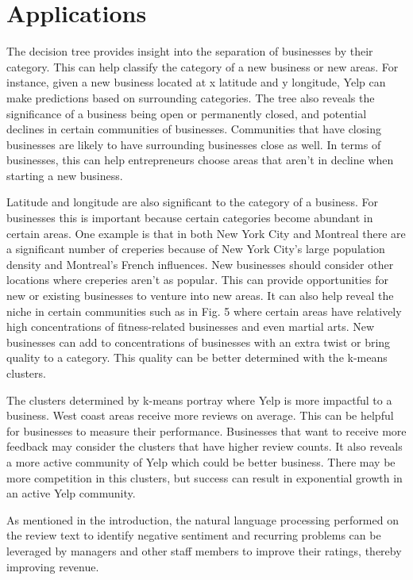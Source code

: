 \section{Applications}

\quad The decision tree provides insight into the separation of businesses by their category. This can help classify the category of a new business or new areas. For instance, given a new business located at x latitude and y longitude, Yelp can make predictions based on surrounding categories. The tree also reveals the significance of a business being open or permanently closed, and potential declines in certain communities of businesses. Communities that have closing businesses are likely to have surrounding businesses close as well. In terms of businesses, this can help entrepreneurs choose areas that aren’t in decline when starting a new business.

\quad Latitude and longitude are also significant to the category of a business. For businesses this is important because certain categories become abundant in certain areas. One example is that in both New York City and Montreal there are a significant number of creperies because of New York City’s large population density and Montreal’s French influences. New businesses should consider other locations where creperies aren’t as popular. This can provide opportunities for new or existing businesses to venture into new areas. It can also help reveal the niche in certain communities such as in Fig. 5 where certain areas have relatively high concentrations of fitness-related businesses and even martial arts. New businesses can add to concentrations of businesses with an extra twist or bring quality to a category. This quality can be better determined with the k-means clusters.

\quad The clusters determined by k-means portray where Yelp is more impactful to a business. West coast areas receive more reviews on average. This can be helpful for businesses to measure their performance. Businesses that want to receive more feedback may consider the clusters that have higher review counts. It also reveals a more active community of Yelp which could be better business. There may be more competition in this clusters, but success can result in exponential growth in an active Yelp community.

\quad As mentioned in the introduction, the natural language processing performed on the review text to identify negative sentiment and recurring problems can be leveraged by managers and other staff members to improve their ratings, thereby improving revenue.

